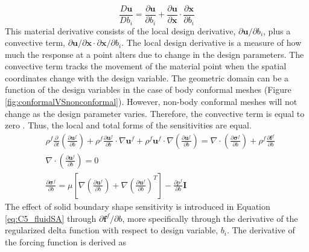 \documentclass[12pt]{aiaa-pretty}
\begin{document}
%
\begin{equation}
	\frac{D\mathbf{u}}{Db_i	} = \frac{\partial \mathbf{u}}{\partial b_i} + 
	                        \frac{\partial \mathbf{u}}{\partial \mathbf{x}} \cdot \frac{\partial \mathbf{x}}{\partial b_i}
\end{equation}
%
This material derivative consists of the local design derivative, $\partial \mathbf{u} / \partial b_i$, plus a convective term, $\partial \mathbf{u} / \partial \mathbf{x} \cdot \partial \mathbf{x} / \partial b_i$. The local design derivative is a measure of how much the response at a point alters due to change in the design parameters. The convective term tracks the movement of the material point when the spatial coordinates change with the design variable. The geometric domain can be a function of the design variables in the case of body conformal meshes (Figure \ref{fig:conformalVSnonconformal}). However, non-body conformal meshes will not change as the design parameter varies. Therefore, the convective term is equal to zero \cite{gobal2014continuum}. Thus, the local and total forms of the sensitivities are equal.
%
\begin{subequations}\label{eq:C5_fluidSA}
\begin{align}
	&\rho^f \frac{\partial}{\partial t} \left( \frac{\partial \mathbf{u}^f}{\partial b} \right) + 
	\rho^f \frac{\partial \mathbf{u}^f}{\partial b} \cdot \nabla \mathbf{u}^f +
	\rho^f \mathbf{u}^f \cdot \nabla \left( \frac{\partial \mathbf{u}^f}{\partial b} \right) = 
	\nabla \cdot \left( \frac{\partial \mathbf{\sigma}^f}{\partial b} \right) +
	\rho^f \frac{\partial \mathbf{f}^f}{\partial b}
	\\
	&\nabla \cdot \left( \frac{\partial \mathbf{u}^f}{\partial b} \right) = 0
	\\
	&\frac{\partial \mathbf{\sigma}^f}{\partial b} = 
	\mu \left[ \nabla \left( \frac{\partial \mathbf{u}^f}{\partial b} \right) + 
	           \nabla \left( \frac{\partial \mathbf{u}^f}{\partial b} \right)^T \right] - 
	\frac{\partial p^f}{\partial b} \mathbf{I}
\end{align}
\end{subequations}
%
The effect of solid boundary shape sensitivity is introduced in Equation \eqref{eq:C5_fluidSA} through $\partial \mathbf{f}^f / \partial b$, more specifically through the derivative of the regularized delta function with respect to design variable, $b_i$. The derivative of the forcing function is derived as
%
\end{document}
